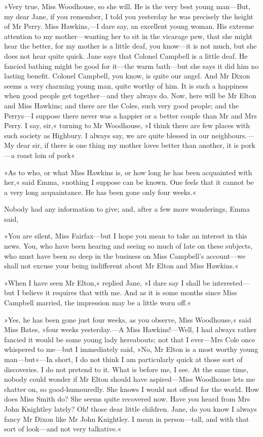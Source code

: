»Very true, Miss Woodhouse, so she will. He is the very best young man—But, my dear Jane, if you remember, I told you yesterday he was precisely the height of Mr Perry. Miss Hawkins,—I dare say, an excellent young woman. His extreme attention to my mother—wanting her to sit in the vicarage pew, that she might hear the better, for my mother is a little deaf, you know—it is not much, but she does not hear quite quick. Jane says that Colonel Campbell is a little deaf. He fancied bathing might be good for it—the warm bath—but she says it did him no lasting benefit. Colonel Campbell, you know, is quite our angel. And Mr Dixon seems a very charming young man, quite worthy of him. It is such a happiness when good people get together—and they always do. Now, here will be Mr Elton and Miss Hawkins; and there are the Coles, such very good people; and the Perrys—I suppose there never was a happier or a better couple than Mr and Mrs Perry. I say, sir,« turning to Mr Woodhouse, »I think there are few places with such society as Highbury. I always say, we are quite blessed in our neighbours.—My dear sir, if there is one thing my mother loves better than another, it is pork—a roast loin of pork\longdash«

»As to who, or what Miss Hawkins is, or how long he has been acquainted with her,« said Emma, »nothing I suppose can be known. One feels that it cannot be a very long acquaintance. He has been gone only four weeks.«

Nobody had any information to give; and, after a few more wonderings, Emma said,

»You are silent, Miss Fairfax—but I hope you mean to take an interest in this news. You, who have been hearing and seeing so much of late on these subjects, who must have been so deep in the business on Miss Campbell's account—we shall not excuse your being indifferent about Mr Elton and Miss Hawkins.«

»When I have seen Mr Elton,« replied Jane, »I dare say I shall be interested—but I believe it requires that with me. And as it is some months since Miss Campbell married, the impression may be a little worn off.«

»Yes, he has been gone just four weeks, as you observe, Miss Woodhouse,« said Miss Bates, »four weeks yesterday.—A Miss Hawkins!—Well, I had always rather fancied it would be some young lady hereabouts; not that I ever—Mrs Cole once whispered to me—but I immediately said, »No, Mr Elton is a most worthy young man—but«—In short, I do not think I am particularly quick at those sort of discoveries. I do not pretend to it. What is before me, I see. At the same time, nobody could wonder if Mr Elton should have aspired—Miss Woodhouse lets me chatter on, so good-humouredly. She knows I would not offend for the world. How does Miss Smith do? She seems quite recovered now. Have you heard from Mrs John Knightley lately? Oh! those dear little children. Jane, do you know I always fancy Mr Dixon like Mr John Knightley. I mean in person—tall, and with that sort of look—and not very talkative.«

